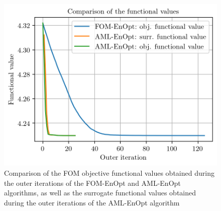 \begin{figure}
\centering
\includegraphics{Plots/functionalValueComp.png}
\caption{\label{FOMAMLEnOptFuncValComp}Comparison of the FOM objective functional values obtained during the outer iterations of the FOM-EnOpt and AML-EnOpt algorithms, as well as the surrogate functional values obtained during the outer iterations of the AML-EnOpt algorithm}
\end{figure}

